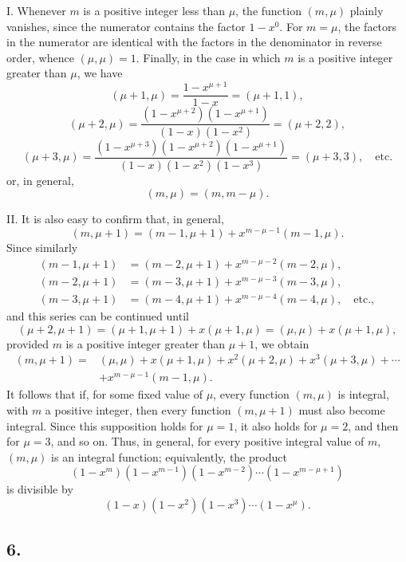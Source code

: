 \documentclass[12pt]{article}
\begin{document}
I. Whenever $m$ is a positive integer less than $\mu$, the function $(m,\mu)$ plainly vanishes, since the numerator contains the factor $1-x^0$. For $m=\mu$, the factors in the numerator are identical with the factors in the denominator in reverse order, whence $(\mu,\mu)=1$. Finally, in the case in which $m$ is a positive integer greater than $\mu$, we have
\[
(\mu+1,\mu)=\frac{1-x^{\mu+1}}{1-x}=(\mu+1,1),
\]
\[
(\mu+2,\mu)=\frac{(1-x^{\mu+2})(1-x^{\mu+1})}{(1-x)(1-x^2)}=(\mu+2,2),
\]
\[
(\mu+3,\mu)=\frac{(1-x^{\mu+3})(1-x^{\mu+2})(1-x^{\mu+1})}{(1-x)(1-x^2)(1-x^3)}=(\mu+3,3),\quad\text{etc.}
\]
or, in general,
\[
(m,\mu)=(m,m-\mu).
\]

II. It is also easy to confirm that, in general,
\[
(m,\mu+1)=(m-1,\mu+1)+x^{m-\mu-1}(m-1,\mu).
\]
Since similarly
\[
\begin{aligned}
(m-1,\mu+1)&=(m-2,\mu+1)+x^{m-\mu-2}(m-2,\mu),\\
(m-2,\mu+1)&=(m-3,\mu+1)+x^{m-\mu-3}(m-3,\mu),\\
(m-3,\mu+1)&=(m-4,\mu+1)+x^{m-\mu-4}(m-4,\mu),\quad\text{etc.},
\end{aligned}
\]
and this series can be continued until
\[
(\mu+2,\mu+1)=(\mu+1,\mu+1)+x(\mu+1,\mu)
=(\mu,\mu)+x(\mu+1,\mu),
\]
provided $m$ is a positive integer greater than $\mu+1$, we obtain
\[
\begin{aligned}
(m,\mu+1)=&(\mu,\mu)+x(\mu+1,\mu)+x^2(\mu+2,\mu)+x^3(\mu+3,\mu)+\cdots\\
&+x^{m-\mu-1}(m-1,\mu).
\end{aligned}
\]
It follows that if, for some fixed value of $\mu$, every function $(m,\mu)$ is integral, with $m$ a positive integer, then every function $(m,\mu+1)$ must also become integral. Since this supposition holds for $\mu=1$, it also holds for $\mu=2$, and then for $\mu=3$, and so on. Thus, in general, for every positive integral value of $m$, $(m,\mu)$ is an integral function; equivalently, the product
\[
(1-x^m)(1-x^{m-1})(1-x^{m-2})\cdots(1-x^{m-\mu+1})
\]
is divisible by
\[
(1-x)(1-x^2)(1-x^3)\cdots(1-x^\mu).
\]

\subsection*{6.}
\end{document}
